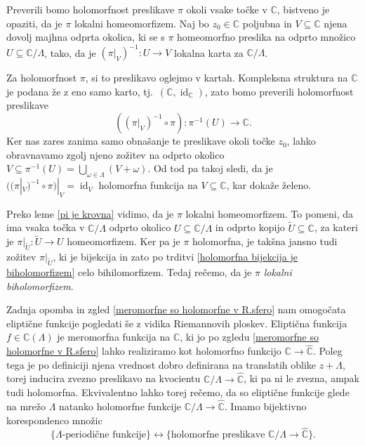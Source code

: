\documentclass[mat1]{fmfdelo}
\numberwithin{equation}{section}
\newcommand{\C}{\mathbb C}
\newcommand{\RS}{\widehat{\C}}
\newcommand{\om}{\omega}
\newcommand{\inv}{^{-1}}
\newcommand{\torus}{\C/\Lambda}
\newcommand{\tj}{tj.\ }
\DeclareMathOperator{\id}{id}
\theoremstyle{definition}
\begin{document}
\begin{dokaz}
    Preverili bomo holomorfnost preslikave $\pi$ okoli vsake točke v $\C$, bistveno je opaziti, da je $\pi$ lokalni homeomorfizem. Naj bo $z_0 \in \C$ poljubna in $V \subseteq \C$ njena dovolj majhna odprta okolica, ki se s $\pi$ homeomorfno preslika na odprto množico $U \subseteq \torus$, tako, da je $(\pi|_{V})\inv : U \to V$ lokalna karta za $\torus$. 

    Za holomorfnost $\pi$, si to preslikavo oglejmo v kartah. Kompleksna struktura na $\C$ je podana že z eno samo karto, \tj $(\C, \id_\C)$, zato bomo preverili holomorfnost preslikave
    \[
        ((\pi|_{V})\inv \circ \pi) : \pi\inv(U) \to \C.
    \]
    Ker nas zares zanima samo obnašanje te preslikave okoli točke $z_0$, lahko obravnavamo zgolj njeno zožitev na odprto okolico $V \subseteq \pi\inv(U) = \bigcup_{\om \in \Lambda} (V + \om)$. Od tod pa takoj sledi, da je $((\pi|_V)\inv \circ \pi)|_V = \id_V$ holomorfna funkcija na $V \subseteq \C$, kar dokaže želeno. 
\end{dokaz}

\begin{opomba}
    Preko leme \ref{pi je krovna} vidimo, da je $\pi$ lokalni homeomorfizem. To pomeni, da ima vsaka točka v $\torus$ odprto okolico $U\subseteq \torus$ in odprto kopijo $\tilde{U} \subseteq \C$, za kateri je $\pi|_{\tilde{U}} : \tilde{U} \to U$ homeomorfizem. Ker pa je $\pi$ holomorfna, je takšna jansno tudi zožitev $\pi|_{\tilde{U}}$, ki je bijekcija in zato po trditvi \ref{holomorfna bijekcija je biholomorfizem} celo bihilomorfizem. Tedaj rečemo, da je $\pi$ \emph{lokalni biholomorfizem}.
\end{opomba}




Zadnja opomba in zgled \ref{meromorfne so holomorfne v R.sfero} nam omogočata eliptične funkcije pogledati še z vidika Riemannovih ploskev. Eliptična funkcija $f \in \C(\Lambda)$ je meromorfna funkcija na $\C$, ki jo po zgledu \ref{meromorfne so holomorfne v R.sfero} lahko realiziramo kot holomorfno funkcijo $\C \to \RS$. Poleg tega je po definiciji njena vrednost dobro definirana na translatih oblike $z + \Lambda$, torej inducira zvezno preslikavo na kvocientu $\torus \to \RS$, ki pa ni le zvezna, ampak tudi holomorfna.  Ekvivalentno lahko torej rečemo, da so eliptične funkcije glede na mrežo $\Lambda$ natanko holomorfne funkcije $\torus \to \RS$. Imamo bijektivno korespondenco množic
\[
    \{\text{$\Lambda$-periodične funkcije}\} \longleftrightarrow \{\text{holomorfne preslikave } \torus \to \RS\}.
\]
\end{document}
